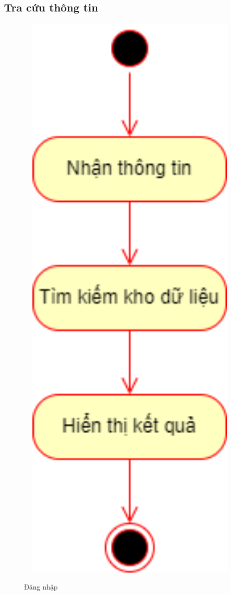 \subsection{Tra cứu thông tin}
  \begin{center}
    \includegraphics[width=1.1\textwidth]{image/activity/search_info.png}
    \begin{figure}
      \centering
      \caption{Đăng nhập}
    \end{figure}
  \end{center}